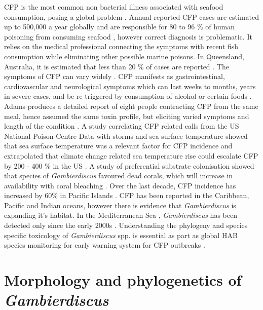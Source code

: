\documentclass[12pt]{article}
\begin{document}
CFP is the most common non bacterial illness associated with seafood consumption, posing a global problem \cite{friedman2008ciguatera}. %
Annual reported CFP cases are estimated up to 500,000 a year globally and are responsible for 80 to 96 \% of human poisoning from consuming seafood \cite{fleming1998seafood,grandjean2008centers}, however correct diagnosis is problematic. It relies on the medical professional connecting the symptoms with recent fish consumption while eliminating other possible marine poisons. In Queensland, Australia, it is estimated that less than 20 \% of cases are reported \cite{lewis2006ciguatera}.
The symptoms of CFP can vary widely \cite{sims1987theoretical}. CFP manifests as gastrointestinal, cardiovascular and neurological symptoms which can last weeks to months, years in severe cases, and be re-triggered by consumption of alcohol or certain foods \cite{lewis2006ciguatera}. Adams produces a detailed report of eight people contracting CFP from the same meal, hence assumed the same toxin profile, but eliciting varied symptoms and length of the condition \cite{adams1993outbreak}. 
A study correlating CFP related calls from the US National Poison Centre Data with storms and sea surface temperature showed that sea surface temperature was a relevant factor for CFP incidence and extrapolated that climate change related sea temperature rise could escalate CFP by 200 - 400 \% in the US \cite{garces2012habitat}. A study of preferential substrate colonisation showed that species of \emph{Gambierdiscus} favoured dead corals, which will increase in availability with coral bleaching \cite{grzebyk1994ecology}. Over the last decade, CFP incidence has increased by 60\% in Pacific Islands \cite{skinner2011ciguatera}.
CFP has been reported in the Caribbean, Pacific and Indian oceans, however there is evidence that \emph{Gambierdiscus} is expanding it's habitat. In the Mediterranean Sea \cite{lejeusne2010climate}, \emph{Gambierdiscus} has been detected only since the early 2000s \cite{aligizaki2008morphological}.
Understanding the phylogeny and species specific toxicology of \emph{Gambierdiscus} spp. is essential as part as global HAB species monitoring for early warning system for CFP outbreaks \cite{berdalet2012global}.


\section{Morphology and phylogenetics of \emph{Gambierdiscus}}
\end{document}
